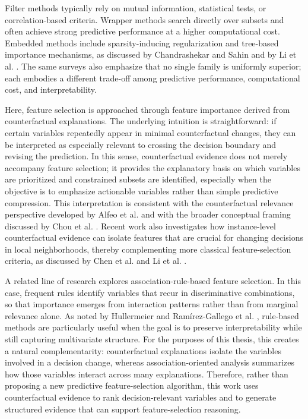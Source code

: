 Filter methods typically rely on mutual information, statistical tests, or correlation-based criteria. Wrapper methods search directly over subsets and often achieve strong predictive performance at a higher computational cost. Embedded methods include sparsity-inducing regularization and tree-based importance mechanisms, as discussed by Chandrashekar and Sahin \cite{chandrashekar2014survey} and by Li et al. \cite{li2017feature}. The same surveys also emphasize that no single family is uniformly superior; each embodies a different trade-off among predictive performance, computational cost, and interpretability.

Here, feature selection is approached through feature importance derived from counterfactual explanations. The underlying intuition is straightforward: if certain variables repeatedly appear in minimal counterfactual changes, they can be interpreted as especially relevant to crossing the decision boundary and revising the prediction. In this sense, counterfactual evidence does not merely accompany feature selection; it provides the explanatory basis on which variables are prioritized and constrained subsets are identified, especially when the objective is to emphasize actionable variables rather than simple predictive compression. This interpretation is consistent with the counterfactual relevance perspective developed by Alfeo et al. \cite{alfeo2023bocsor} and with the broader conceptual framing discussed by Chou et al. \cite{chou2022counterfactuals}. Recent work also investigates how instance-level counterfactual evidence can isolate features that are crucial for changing decisions in local neighborhoods, thereby complementing more classical feature-selection criteria, as discussed by Chen et al. \cite{chen2022causalfs} and Li et al. \cite{li2017feature}.

A related line of research explores association-rule-based feature selection. In this case, frequent rules identify variables that recur in discriminative combinations, so that importance emerges from interaction patterns rather than from marginal relevance alone. As noted by Hullermeier \cite{hullermeier2006association} and Ramírez-Gallego et al. \cite{ramirezgallego2014association}, rule-based methods are particularly useful when the goal is to preserve interpretability while still capturing multivariate structure. For the purposes of this thesis, this creates a natural complementarity: counterfactual explanations isolate the variables involved in a decision change, whereas association-oriented analysis summarizes how those variables interact across many explanations. Therefore, rather than proposing a new predictive feature-selection algorithm, this work uses counterfactual evidence to rank decision-relevant variables and to generate structured evidence that can support feature-selection reasoning.


